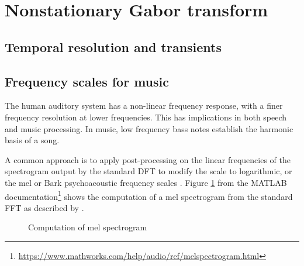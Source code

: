 \documentclass[letter,12pt,notitlepage]{article}
\begin{document}
\vfill
\clearpage

\section{Nonstationary Gabor transform}
\label{sec:theorymusic}

\subsection{Temporal resolution and transients}
\label{sec:freqscales}

\subsection{Frequency scales for music}
\label{sec:freqscales}


The human auditory system has a non-linear frequency response, with a finer frequency resolution at lower frequencies.  This has implications in both speech and music processing. In music, low frequency bass notes establish the harmonic basis of a song. 


A common approach is to apply post-processing on the linear frequencies of the spectrogram output by the standard DFT to modify the scale to logarithmic, or the mel or Bark psychoacoustic frequency scales . Figure \ref{fig:melfilter} from the MATLAB documentation\footnote{\href{https://www.mathworks.com/help/audio/ref/melspectrogram.html}{https://www.mathworks.com/help/audio/ref/melspectrogram.html}} shows the computation of a mel spectrogram from the standard FFT as described by \citet[463]{melbook}.


\begin{figure}[ht]
	\centering
	\caption{Computation of mel spectrogram}
	\label{fig:melfilter}
\end{figure}
\end{document}

